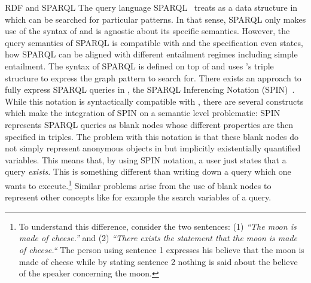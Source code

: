 \begin{paragraph}{RDF and SPARQL}
The query language SPARQL~\cite{sparql} treats \rdf as a data structure in which can be searched for particular patterns. In that sense, SPARQL only makes use of the syntax of \rdf and 
is agnostic about its specific semantics. However, the query semantics of SPARQL is compatible with \rdf and the specification even states, how SPARQL can be aligned with different 
entailment regimes including simple \rdf entailment.  The syntax of SPARQL is defined on top of \rdf and uses \rdf's  triple structure to express the graph pattern to search for. 
There exists an approach to fully express SPARQL
queries in \rdf, the SPARQL Inferencing Notation (SPIN)~\cite{spin}. 
While this notation is syntactically compatible with \rdf, there are several constructs which make the integration of SPIN on a semantic level problematic:
SPIN represents SPARQL queries as blank nodes whose different properties are then specified in \rdf triples. The problem with this notation is that these blank nodes do 
not simply represent anonymous objects in \rdf but implicitly existentially quantified variables. This means that, by using SPIN notation, a user just states that a 
query \emph{exists}. This is something different than writing down a query which one wants to execute.\footnote{
To understand this difference, consider the two sentences: (1) \emph{``The moon is made of cheese.''} and (2) \emph{``There exists the statement that the moon is made of cheese.``}
The person using sentence 1 expresses his believe that the moon is made of cheese while by stating sentence 2 nothing is said about the believe of the speaker concerning the moon.
} 
Similar problems arise from the use of blank nodes to represent other concepts like for example the search variables of a query. 
\end{paragraph}

